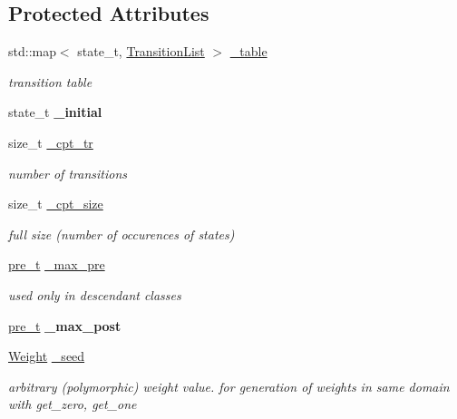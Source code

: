 \subsection*{Protected Attributes}
\begin{DoxyCompactItemize}
\item 
\mbox{\label{classWTA_a0d3422d597fbe64d655d9ced77dd7b8f}} 
std\+::map$<$ state\+\_\+t, \mbox{\hyperlink{classTransitionList}{Transition\+List}} $>$ \mbox{\hyperlink{classWTA_a0d3422d597fbe64d655d9ced77dd7b8f}{\+\_\+table}}
\begin{DoxyCompactList}\small\item\em transition table \end{DoxyCompactList}\item 
\mbox{\label{classWTA_a52dd7c5ad9439670d75df10f2dd1e4df}} 
state\+\_\+t {\bfseries \+\_\+initial}
\item 
\mbox{\label{classWTA_a76cf3c27412f9d61464a8a82aea97b89}} 
size\+\_\+t \mbox{\hyperlink{classWTA_a76cf3c27412f9d61464a8a82aea97b89}{\+\_\+cpt\+\_\+tr}}
\begin{DoxyCompactList}\small\item\em number of transitions \end{DoxyCompactList}\item 
\mbox{\label{classWTA_a3ed6ca11b3e520485171a0f07deffd21}} 
size\+\_\+t \mbox{\hyperlink{classWTA_a3ed6ca11b3e520485171a0f07deffd21}{\+\_\+cpt\+\_\+size}}
\begin{DoxyCompactList}\small\item\em full size (number of occurences of states) \end{DoxyCompactList}\item 
\mbox{\label{classWTA_ae6d1c616caceb7819d4d23f4a635cddc}} 
\mbox{\hyperlink{group__general_ga092fe8b972dfa977c2a0886720a7731e}{pre\+\_\+t}} \mbox{\hyperlink{classWTA_ae6d1c616caceb7819d4d23f4a635cddc}{\+\_\+max\+\_\+pre}}
\begin{DoxyCompactList}\small\item\em used only in descendant classes \end{DoxyCompactList}\item 
\mbox{\label{classWTA_acb19a9da4f88e4b3538b6889cbd49a08}} 
\mbox{\hyperlink{group__general_ga092fe8b972dfa977c2a0886720a7731e}{pre\+\_\+t}} {\bfseries \+\_\+max\+\_\+post}
\item 
\mbox{\label{classWTA_ad93a124d289cf4d1e2801fccb01ca8ea}} 
\mbox{\hyperlink{classWeight}{Weight}} \mbox{\hyperlink{classWTA_ad93a124d289cf4d1e2801fccb01ca8ea}{\+\_\+seed}}
\begin{DoxyCompactList}\small\item\em arbitrary (polymorphic) weight value. for generation of weights in same domain with get\+\_\+zero, get\+\_\+one \end{DoxyCompactList}\end{DoxyCompactItemize}
